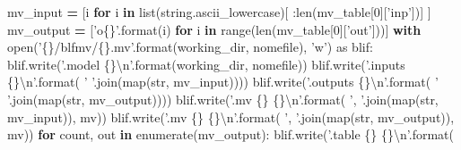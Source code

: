 \documentclass[italian,]{book}
\newenvironment{Shaded}{\begin{snugshade}}{\end{snugshade}}
\newcommand{\BuiltInTok}[1]{#1}
\newcommand{\CharTok}[1]{\textcolor[rgb]{0.31,0.60,0.02}{#1}}
\newcommand{\ControlFlowTok}[1]{\textcolor[rgb]{0.13,0.29,0.53}{\textbf{#1}}}
\newcommand{\DecValTok}[1]{\textcolor[rgb]{0.00,0.00,0.81}{#1}}
\newcommand{\ImportTok}[1]{#1}
\newcommand{\KeywordTok}[1]{\textcolor[rgb]{0.13,0.29,0.53}{\textbf{#1}}}
\newcommand{\NormalTok}[1]{#1}
\newcommand{\OperatorTok}[1]{\textcolor[rgb]{0.81,0.36,0.00}{\textbf{#1}}}
\newcommand{\SpecialCharTok}[1]{\textcolor[rgb]{0.00,0.00,0.00}{#1}}
\newcommand{\StringTok}[1]{\textcolor[rgb]{0.31,0.60,0.02}{#1}}
\begin{document}
\begin{Shaded}
\begin{Highlighting}[]
\NormalTok{mv_input }\OperatorTok{=}\NormalTok{ [i }\ControlFlowTok{for}\NormalTok{ i }\KeywordTok{in} \BuiltInTok{list}\NormalTok{(string.ascii_lowercase)[}
\NormalTok{    :}\BuiltInTok{len}\NormalTok{(mv_table[}\DecValTok{0}\NormalTok{][}\StringTok{'inp'}\NormalTok{])]}
\NormalTok{  ]}
\NormalTok{mv_output }\OperatorTok{=}\NormalTok{ [}\StringTok{'o}\SpecialCharTok{\{\}}\StringTok{'}\NormalTok{.}\BuiltInTok{format}\NormalTok{(i) }\ControlFlowTok{for}\NormalTok{ i }\KeywordTok{in} \BuiltInTok{range}\NormalTok{(}\BuiltInTok{len}\NormalTok{(mv_table[}\DecValTok{0}\NormalTok{][}\StringTok{'out'}\NormalTok{]))]}
\ControlFlowTok{with} \BuiltInTok{open}\NormalTok{(}\StringTok{'}\SpecialCharTok{\{\}}\StringTok{/blfmv/}\SpecialCharTok{\{\}}\StringTok{.mv'}\NormalTok{.}\BuiltInTok{format}\NormalTok{(working_dir, nomefile), }\StringTok{'w'}\NormalTok{) }\ImportTok{as}\NormalTok{ blif:}
\NormalTok{  blif.write(}\StringTok{'.model }\SpecialCharTok{\{\}}\CharTok{\textbackslash{}n}\StringTok{'}\NormalTok{.}\BuiltInTok{format}\NormalTok{(working_dir, nomefile))}
\NormalTok{  blif.write(}\StringTok{'.inputs }\SpecialCharTok{\{\}}\CharTok{\textbackslash{}n}\StringTok{'}\NormalTok{.}\BuiltInTok{format}\NormalTok{(}
      \StringTok{' '}\NormalTok{.join(}\BuiltInTok{map}\NormalTok{(}\BuiltInTok{str}\NormalTok{, mv_input))))}
\NormalTok{  blif.write(}\StringTok{'.outputs }\SpecialCharTok{\{\}}\CharTok{\textbackslash{}n}\StringTok{'}\NormalTok{.}\BuiltInTok{format}\NormalTok{(}
      \StringTok{' '}\NormalTok{.join(}\BuiltInTok{map}\NormalTok{(}\BuiltInTok{str}\NormalTok{, mv_output))))}
\NormalTok{  blif.write(}\StringTok{'.mv }\SpecialCharTok{\{\}}\StringTok{ }\SpecialCharTok{\{\}}\CharTok{\textbackslash{}n}\StringTok{'}\NormalTok{.}\BuiltInTok{format}\NormalTok{(}
      \StringTok{', '}\NormalTok{.join(}\BuiltInTok{map}\NormalTok{(}\BuiltInTok{str}\NormalTok{, mv_input)), mv))}
\NormalTok{  blif.write(}\StringTok{'.mv }\SpecialCharTok{\{\}}\StringTok{ }\SpecialCharTok{\{\}}\CharTok{\textbackslash{}n}\StringTok{'}\NormalTok{.}\BuiltInTok{format}\NormalTok{(}
      \StringTok{', '}\NormalTok{.join(}\BuiltInTok{map}\NormalTok{(}\BuiltInTok{str}\NormalTok{, mv_output)), mv))}
  \ControlFlowTok{for}\NormalTok{ count, out }\KeywordTok{in} \BuiltInTok{enumerate}\NormalTok{(mv_output):}
\NormalTok{      blif.write(}\StringTok{'.table }\SpecialCharTok{\{\}}\StringTok{ }\SpecialCharTok{\{\}}\CharTok{\textbackslash{}n}\StringTok{'}\NormalTok{.}\BuiltInTok{format}\NormalTok{(}

\end{Highlighting}
\end{Shaded}
\end{document}
